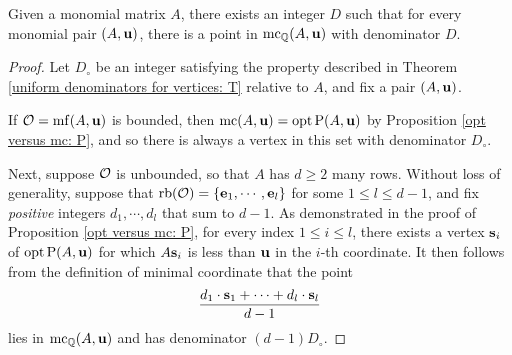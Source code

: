 \documentclass[11pt]{amsart}
\renewcommand{\!}[1]{{\color{red}\text{$\star$\,}#1\,$\star$}}
\begin{document}


\begin{theorem}  
\label{uniform denominators for mc:  T}
Given a monomial matrix $A$, there exists an integer $D$ such that for every monomial pair $(A, \mathbf{u})$, there is a point in $\operatorname{mc}_{\mathbb{Q}}(A, \mathbf{u})$ with denominator $D$.
\end{theorem}


\begin{proof}  Let $D_{\circ}$ be an integer satisfying the property described in Theorem \ref{uniform denominators for vertices:  T} relative to $A$, and fix a pair $(A, \mathbf{u})$.  

If $\mathcal{O} = \operatorname{mf}(A, \mathbf{u})$ is bounded, then $\operatorname{mc}(A, \mathbf{u}) = \operatorname{opt} \mathrm{P}(A, \mathbf{u})$ by Proposition \ref{opt versus mc: P}, and so there is always a vertex in this set with denominator $D_{\circ}$.  

Next,  suppose $\mathcal{O}$ is unbounded, so that $A$ has $d \geq 2$ many rows.  Without loss of generality, suppose that $\operatorname{rb}(\mathcal{O}) = \{ \mathbf{e}_1, \cdots, \mathbf{e}_l \}$ for some $1 \leq l \leq d-1$, and fix \emph{positive} integers $d_1, \cdots, d_l$ that sum to $d-1$.  As demonstrated in the  proof of Proposition \ref{opt versus mc: P}, for every index  $1 \leq i \leq l$, there exists a vertex $\mathbf{s}_i$ of $\operatorname{opt} \mathrm{P}(A, \mathbf{u})$ for which $A \mathbf{s}_i$ is less than $\mathbf{u}$ in the $i$-th coordinate.  It then follows from the definition of minimal coordinate that the point \[  \frac{ d_1 \cdot \mathbf{s}_1 + \cdots + d_l \cdot  \mathbf{s}_l}{d-1}  \]
lies in $\operatorname{mc}_{\mathbb{Q}}(A, \mathbf{u})$ and has denominator $(d-1)D_{\circ}$.  
\end{proof}
\end{document}
